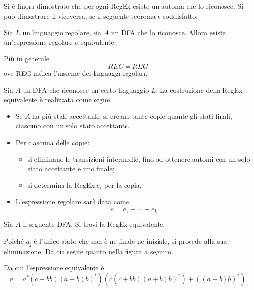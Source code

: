 \documentclass{subfiles}
\begin{document}
Si è finora dimostrato che per ogni RegEx esiste un automa che lo riconosce. Si può dimostrare il viceversa, se il seguente teorema è soddisfatto.
\begin{Theorem*}[di Kleene]
    Sia \(L\) un linguaggio regolare, sia \(A\) un DFA che lo riconosce. Allora esiste un'espressione regolare \(e\) equivalente.

    Più in generale
    \[
        REC = REG
    \]
    ove REG indica l'insieme dei linguaggi regolari.
\end{Theorem*}


\begin{Algorithm*}
    Sia \(A\) un DFA che riconosce un certo linguaggio \(L\). La costruzione della RegEx equivalente è realizzata come segue.
    \begin{itemize}
        \item Se \(A\) ha più stati accettanti, si creano tante copie quante gli stati finali, ciascuno con un solo stato accettante.
        \item Per ciascuna delle copie:
              \begin{itemize}
                  \item si eliminano le transizioni intermedie, fino ad ottenere automi con un solo stato accettante e uno finale;
                  \item si determina la RegEx \(e_{i}\) per la copia.
              \end{itemize}
        \item L'espressione regolare sarà data come
              \[
                  e = e_{1} + \cdots + e_{k}
              \]
    \end{itemize}
\end{Algorithm*}

\begin{Example*}
    Sia \(A\) il seguente DFA. Si trovi la RegEx equivalente.
    

    \begin{Solution*}
        Poiché \(q_{2}\) è l'unico stato che non è ne finale ne iniziale, si procede alla sua eliminazione.
        Da cio segue quanto nella figura a seguito.
        

        \noindent Da cui l'espressione equivalente è
        \[
            e = a^{*}(c + bb((a + b)b)^{*})(c(c + bb((a + b)b)^{*}) + ((a + b)b)^{*})
        \]
    \end{Solution*}
\end{Example*}
\clearpage
\end{document}
